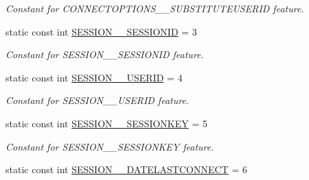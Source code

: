 \begin{DoxyCompactItemize}
\begin{DoxyCompactList}\small\item\em Constant for CONNECTOPTIONS\_\-\_\-SUBSTITUTEUSERID feature. \item\end{DoxyCompactList}\item 
\hypertarget{classUMS__Data_1_1UMS__DataPackage_a24ba73dd132b47c577aff0684e79b786}{
static const int \hyperlink{classUMS__Data_1_1UMS__DataPackage_a24ba73dd132b47c577aff0684e79b786}{SESSION\_\-\_\-SESSIONID} = 3}
\label{classUMS__Data_1_1UMS__DataPackage_a24ba73dd132b47c577aff0684e79b786}

\begin{DoxyCompactList}\small\item\em Constant for SESSION\_\-\_\-SESSIONID feature. \item\end{DoxyCompactList}\item 
\hypertarget{classUMS__Data_1_1UMS__DataPackage_a60613025f7784451c379dbeb964099aa}{
static const int \hyperlink{classUMS__Data_1_1UMS__DataPackage_a60613025f7784451c379dbeb964099aa}{SESSION\_\-\_\-USERID} = 4}
\label{classUMS__Data_1_1UMS__DataPackage_a60613025f7784451c379dbeb964099aa}

\begin{DoxyCompactList}\small\item\em Constant for SESSION\_\-\_\-USERID feature. \item\end{DoxyCompactList}\item 
\hypertarget{classUMS__Data_1_1UMS__DataPackage_a61b4ed0664ba137be883b88543ae0c79}{
static const int \hyperlink{classUMS__Data_1_1UMS__DataPackage_a61b4ed0664ba137be883b88543ae0c79}{SESSION\_\-\_\-SESSIONKEY} = 5}
\label{classUMS__Data_1_1UMS__DataPackage_a61b4ed0664ba137be883b88543ae0c79}

\begin{DoxyCompactList}\small\item\em Constant for SESSION\_\-\_\-SESSIONKEY feature. \item\end{DoxyCompactList}\item 
\hypertarget{classUMS__Data_1_1UMS__DataPackage_a054a2dc9382456429205373fed0927f6}{
static const int \hyperlink{classUMS__Data_1_1UMS__DataPackage_a054a2dc9382456429205373fed0927f6}{SESSION\_\-\_\-DATELASTCONNECT} = 6}
\label{classUMS__Data_1_1UMS__DataPackage_a054a2dc9382456429205373fed0927f6}


\end{DoxyCompactItemize}
